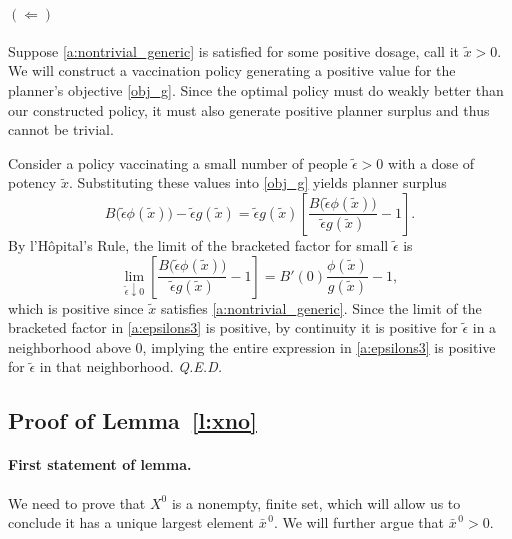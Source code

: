 \documentclass[12pt]{article}
\renewcommand{\qed}{{\it Q.E.D.}}
\newcommand{\efficacy}{\phi}
\newcommand{\general}{g}
\newcommand{\benefit}{B}
\newcommand{\Xno}{X^{0}}
\newcommand{\xnobar}{\bar{x}^{\,0}}
\newcommand{\etilde}{\tilde{\epsilon}}
\newcommand{\xtilde}{\tilde{x}}
\begin{document}
\paragraph{$(\Longleftarrow)$}

Suppose \eqref{a:nontrivial_generic} is satisfied for some positive
dosage, call it $\xtilde > 0$. We will construct a vaccination policy
generating a positive value for the planner's objective
\eqref{obj_g}. Since the optimal policy must do weakly better than our
constructed policy, it must also generate positive planner surplus and
thus cannot be trivial.

Consider a policy vaccinating a small number of people $\etilde > 0$ with
a dose of potency $\xtilde$. Substituting these values into \eqref{obj_g}
yields planner surplus
\begin{equation}
\label{a:epsilons3}
\benefit \bigl( \etilde \efficacy(\xtilde) \bigr) - \etilde
\general(\xtilde) = \etilde \general(\xtilde) \left[ \frac{\benefit
    \bigl( \etilde \efficacy(\xtilde) \bigr)}{\etilde
    \general(\xtilde)} - 1 \right].
\end{equation}
By l'H\^{o}pital's Rule, the limit of the bracketed factor for small
$\etilde$ is
\begin{equation}
\label{a:lHopital3}
\lim_{\etilde \downarrow 0} \left[ \frac{\benefit \bigl( \etilde
    \efficacy(\xtilde) \bigr)}{\etilde \general(\xtilde)} - 1 \right]
= \benefit'(0) \frac{\efficacy(\xtilde)}{\general(\xtilde)} - 1,
\end{equation}
which is positive since $\xtilde$ satisfies
\eqref{a:nontrivial_generic}. Since the limit of the bracketed factor
in \eqref{a:epsilons3} is positive, by continuity it is positive for
$\etilde$ in a neighborhood above 0, implying the entire expression in
\eqref{a:epsilons3} is positive for $\etilde$ in that
neighborhood. \qed


\subsection*{Proof of Lemma~\ref{l:xno}}

\paragraph{First statement of lemma.}

We need to prove that $\Xno$ is a nonempty, finite set, which will
allow us to conclude it has a unique largest element $\xnobar$. We
will further argue that $\xnobar > 0$.
\end{document}
